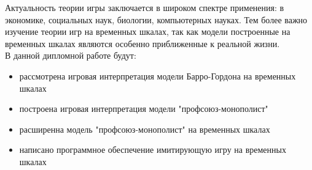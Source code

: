 Актуальность теории игры заключается в широком спектре применения: в экономике, социальных наук, биологии, компьютерных науках. Тем более важно изучение теории игр на временных шкалах, так как модели построенные на временных шкалах являются особенно приближенные к реальной жизни. \\
В данной дипломной работе будут:
\begin{itemize}
	\item рассмотрена игровая интерпретация модели Барро-Гордона на временных шкалах
	\item построена игровая интерпретация модели "профсоюз-монополист"
	\item расширенна модель "профсоюз-монополист" на временных шкалах
	\item написано программное обеспечение имитирующую игру на временных шкалах
\end{itemize} 